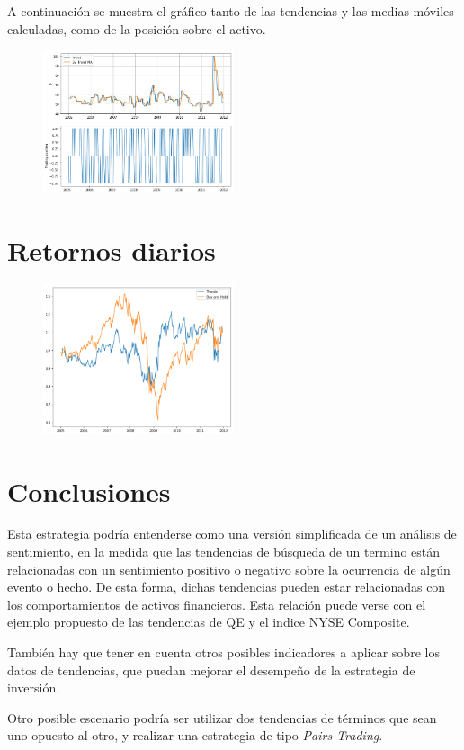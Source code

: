 \documentclass[a4paper, 11pt, twocolumn]{article}
\begin{document}
A continuación se muestra el gráfico tanto de las tendencias y las medias móviles calculadas, como de la posición sobre el activo.
\begin{figure}[ht]
\centering
\includegraphics[width=0.5\textwidth]{fig6.png}
\end{figure}

\section{Retornos diarios}


\begin{figure}[ht]
\centering
\includegraphics[width=0.5\textwidth]{fig8.png}
\end{figure}

\section{Conclusiones}
Esta estrategia podría entenderse como una versión simplificada de un análisis de sentimiento, en la medida que las tendencias de búsqueda de un termino están relacionadas con un sentimiento positivo o negativo sobre la ocurrencia de algún evento o hecho. De esta forma, dichas tendencias pueden estar relacionadas con los comportamientos de activos financieros. Esta relación puede verse con el ejemplo propuesto de las tendencias de QE y el indice NYSE Composite.

También hay que tener en cuenta otros posibles indicadores a aplicar sobre los datos de tendencias, que puedan mejorar el desempeño de la estrategia de inversión.

Otro posible escenario podría ser utilizar dos tendencias de términos que sean uno opuesto al otro, y realizar una estrategia de tipo \textit{Pairs Trading}.
\end{document}
